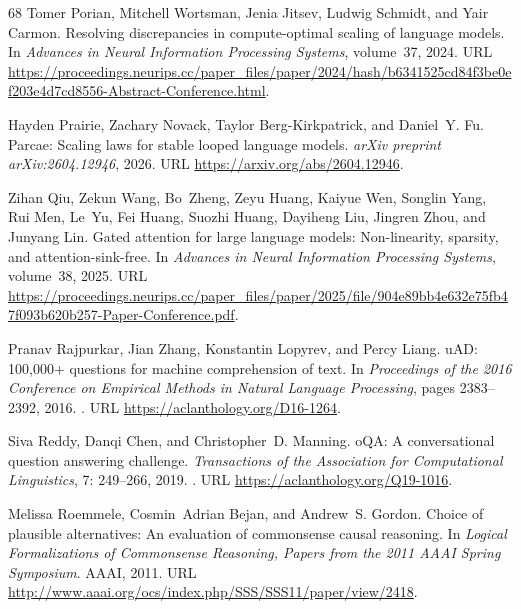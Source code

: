 \documentclass[]{bytedance_seed}
\theoremstyle{definition}
\theoremstyle{remark}
\begin{document}
\begin{thebibliography}{68}
Tomer Porian, Mitchell Wortsman, Jenia Jitsev, Ludwig Schmidt, and Yair Carmon.
\newblock Resolving discrepancies in compute-optimal scaling of language
  models.
\newblock In \emph{Advances in Neural Information Processing Systems},
  volume~37, 2024.
\newblock URL
  \url{https://proceedings.neurips.cc/paper_files/paper/2024/hash/b6341525cd84f3be0ef203e4d7cd8556-Abstract-Conference.html}.

Hayden Prairie, Zachary Novack, Taylor Berg-Kirkpatrick, and Daniel~Y. Fu.
\newblock Parcae: Scaling laws for stable looped language models.
\newblock \emph{arXiv preprint arXiv:2604.12946}, 2026.
\newblock URL \url{https://arxiv.org/abs/2604.12946}.

Zihan Qiu, Zekun Wang, Bo~Zheng, Zeyu Huang, Kaiyue Wen, Songlin Yang, Rui Men,
  Le~Yu, Fei Huang, Suozhi Huang, Dayiheng Liu, Jingren Zhou, and Junyang Lin.
\newblock Gated attention for large language models: Non-linearity, sparsity,
  and attention-sink-free.
\newblock In \emph{Advances in Neural Information Processing Systems},
  volume~38, 2025.
\newblock URL
  \url{https://proceedings.neurips.cc/paper_files/paper/2025/file/904e89bb4e632e75fb47f093b620b257-Paper-Conference.pdf}.

Pranav Rajpurkar, Jian Zhang, Konstantin Lopyrev, and Percy Liang.
u{AD}: 100,000+ questions for machine comprehension of text.
\newblock In \emph{Proceedings of the 2016 Conference on Empirical Methods in
  Natural Language Processing}, pages 2383--2392, 2016.
\newblock {}.
\newblock URL \url{https://aclanthology.org/D16-1264}.

Siva Reddy, Danqi Chen, and Christopher~D. Manning.
o{QA}: A conversational question answering challenge.
\newblock \emph{Transactions of the Association for Computational Linguistics},
  7: 249--266, 2019.
\newblock {}.
\newblock URL \url{https://aclanthology.org/Q19-1016}.

Melissa Roemmele, Cosmin~Adrian Bejan, and Andrew~S. Gordon.
\newblock Choice of plausible alternatives: An evaluation of commonsense causal
  reasoning.
\newblock In \emph{Logical Formalizations of Commonsense Reasoning, Papers from
  the 2011 AAAI Spring Symposium}. {AAAI}, 2011.
\newblock URL
  \url{http://www.aaai.org/ocs/index.php/SSS/SSS11/paper/view/2418}.


\end{thebibliography}
\end{document}
